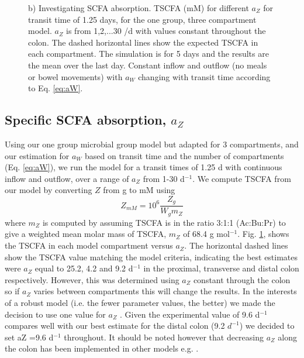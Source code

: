 \documentclass[a4paper]{article}
\begin{document}
\begin{figure}
{%
    b) Investigating SCFA absorption. TSCFA (mM) for different $a_Z$ for transit time of 1.25 days, for the one group, three compartment model. $a_Z$ is from 1,2,...30 /d with values constant throughout the colon. The dashed horizontal lines show the expected TSCFA in each compartment. The simulation is for 5 days and the results are the mean over the last day. Constant inflow and outflow (no meals or bowel movements) with $a_W$ changing with transit time according to Eq. \ref{eq:aW}. 
    }
    \label{fig:aWaZ}
\end{figure}




\subsection{Specific SCFA absorption, $a_Z$}

Using our one group microbial group model but adapted for 3 compartments, and our estimation for $a_W$ based on transit time and the number of compartments (Eq. \ref{eq:aW}), we run the model for a transit times of 1.25 d with continuous inflow and outflow, over a range of $a_Z$ from 1-30 d$^{-1}$.
We compute TSCFA from our model by converting $Z$ from g to mM  using 
\begin{equation}
    Z_{mM}=10^6\frac{Z_g}{W_g m_Z}
\end{equation}
where $m_Z$ is computed by assuming TSCFA is in the ratio 3:1:1 (Ac:Bu:Pr) to give a weighted mean molar mass of TSCFA, $m_Z$ of 68.4 g mol$^{-1}$.
Fig. \ref{fig:aWaZ}, shows the TSCFA in each model compartment versus $a_Z$. The horizontal dashed lines show the TSCFA value matching the model criteria, indicating the best estimates were $a_Z$ equal to 25.2, 4.2 and 9.2 d$^{-1}$ in the proximal, transverse and distal colon respectively.
However, this was determined using $a_Z$ constant through the colon so if $a_Z$ varies between compartments this will change the results. 
In the interests of a robust model (i.e. the fewer parameter values, the better) we made the decision to use one value for $a_Z$ . 
Given the experimental value of 9.6 d$^{-1}$ compares well with our best estimate for the distal colon (9.2 $d^{-1}$) we decided to set aZ =9.6 d$^{-1}$ throughout. 
It should be noted however that decreasing $a_Z$ along the colon has been implemented in other models e.g. \cite{Labarthe}. 
\end{document}
